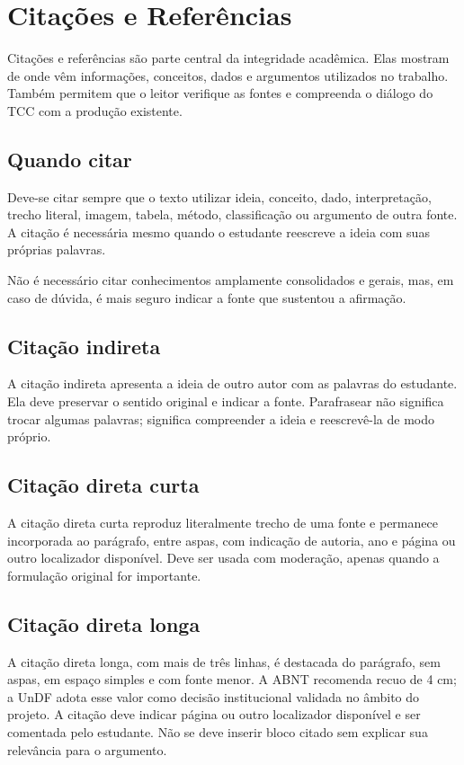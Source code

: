 \chapter{Citações e Referências}

Citações e referências são parte central da integridade acadêmica. Elas mostram de onde vêm informações, conceitos, dados e argumentos utilizados no trabalho. Também permitem que o leitor verifique as fontes e compreenda o diálogo do TCC com a produção existente.

\section{Quando citar}

Deve-se citar sempre que o texto utilizar ideia, conceito, dado, interpretação, trecho literal, imagem, tabela, método, classificação ou argumento de outra fonte. A citação é necessária mesmo quando o estudante reescreve a ideia com suas próprias palavras.

Não é necessário citar conhecimentos amplamente consolidados e gerais, mas, em caso de dúvida, é mais seguro indicar a fonte que sustentou a afirmação.

\section{Citação indireta}

A citação indireta apresenta a ideia de outro autor com as palavras do estudante. Ela deve preservar o sentido original e indicar a fonte. Parafrasear não significa trocar algumas palavras; significa compreender a ideia e reescrevê-la de modo próprio.

\section{Citação direta curta}

A citação direta curta reproduz literalmente trecho de uma fonte e permanece incorporada ao parágrafo, entre aspas, com indicação de autoria, ano e página ou outro localizador disponível. Deve ser usada com moderação, apenas quando a formulação original for importante.

\section{Citação direta longa}

A citação direta longa, com mais de três linhas, é destacada do parágrafo, sem aspas, em espaço simples e com fonte menor. A ABNT recomenda recuo de 4 cm; a UnDF adota esse valor como decisão institucional validada no âmbito do projeto. A citação deve indicar página ou outro localizador disponível e ser comentada pelo estudante. Não se deve inserir bloco citado sem explicar sua relevância para o argumento.

